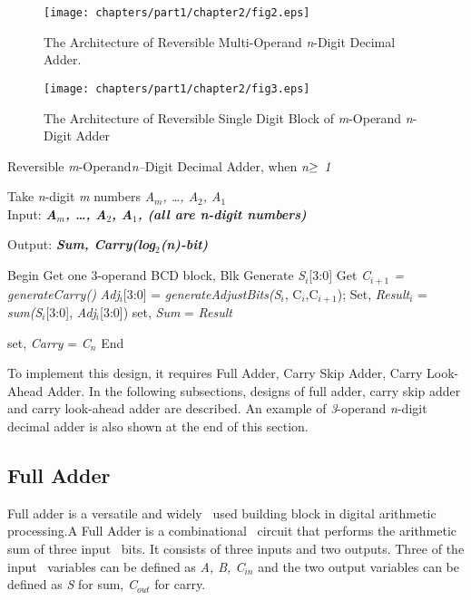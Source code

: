 \begin{figure}[!tbh]
\centering
\texttt{[image: chapters/part1/chapter2/fig2.eps]}
\caption{The Architecture of Reversible Multi-Operand {\it n}-Digit Decimal Adder.}
\label{fig:p1_c2_fig2}
\end{figure}

\begin{figure}[!tbh]
\centering
\texttt{[image: chapters/part1/chapter2/fig3.eps]}
\caption{The Architecture of Reversible Single Digit Block of {\it m}-Operand {\it n}-Digit Adder}
\label{fig:p1_c2_fig3}
\end{figure}

\begin{algorithm}[!h]
\caption{Reversible {\it m}-Operand{\it n--}Digit Decimal Adder, when {\it n$\bold{\ge}$ 1}}
Take \textit{n}-digit \textit{m} numbers {\it A${}_{m}$, {\dots}, A${}_{2}$, A${}_{1}$}
\label{alg:part1_c2_alg1}
\\Input: {\bf {\it A${}_{m}$, {\dots}, A${}_{2}$, A${}_{1}$, (all are n-digit numbers)}}

{\bf {\it }}Output: {\bf {\it Sum, Carry(log${}_{2}$(n)-bit)}}
\begin{algorithmic}[1]

\STATE Begin
\STATE Get one 3-operand BCD block, Blk
\STATE Generate \textit{S}${}_{i}$[3:0]
\STATE Get\textit{ C${}_{i+1}$ = generateCarry()}
\STATE \textit{Adj}${}_{i}$[3:0] = \textit{generateAdjustBits(S${}_{i}$}, C${}_{i}$,C${}_{i+1}$);
\STATE Set, \textit{Result}${}_{i}$ = \textit{sum(S}${}_{i}$[3:0], \textit{Adj}${}_{i}$[3:0])
\ENDFOR
\STATE set, {\it Sum} =\textit{ Result}

\STATE set, {\it Carry} = \textit{C}${}_{n}${\bf }
\STATE End
\end{algorithmic}
\end{algorithm}

To implement this design, it requires Full Adder, Carry Skip Adder, Carry Look-Ahead Adder. In the following subsections, designs of full adder, carry skip adder and carry look-ahead adder are described. An example of {\it 3}-operand {\it n}-digit decimal adder is also shown at the end of this section.

\subsection{Full Adder}
Full adder is a versatile and widely~ used building block in digital arithmetic processing.A Full Adder is a combinational~ circuit that performs the arithmetic sum of three input~ bits. It consists of three inputs and two outputs. Three of the input~ variables can be defined as {\it A, B, C${}_{in}$} and the two output variables can be defined as {\it S} for sum, {\it C${}_{out}$} for carry.

